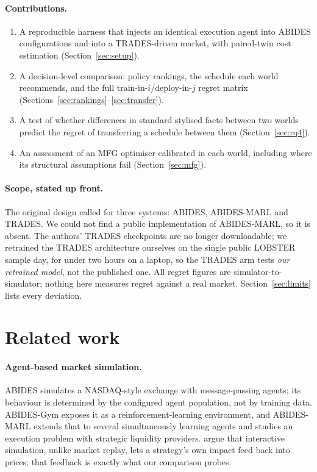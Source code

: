 \paragraph{Contributions.}
\begin{enumerate}[leftmargin=*,itemsep=2pt]
\item A reproducible harness that injects an identical execution agent into ABIDES configurations and into a TRADES-driven market, with paired-twin cost estimation (Section~\ref{sec:setup}).
\item A decision-level comparison: policy rankings, the schedule each world recommends, and the full train-in-$i$/deploy-in-$j$ regret matrix (Sections~\ref{sec:rankings}--\ref{sec:transfer}).
\item A test of whether differences in standard stylised facts between two worlds predict the regret of transferring a schedule between them (Section~\ref{sec:rq4}).
\item An assessment of an MFG optimiser calibrated in each world, including where its structural assumptions fail (Section~\ref{sec:mfg}).
\end{enumerate}

\paragraph{Scope, stated up front.} The original design called for three systems: ABIDES, ABIDES-MARL \citep{cheridito2025abidesmarl} and TRADES. We could not find a public implementation of ABIDES-MARL, so it is absent. The authors' TRADES checkpoints are no longer downloadable; we retrained the TRADES architecture ourselves on the single public LOBSTER sample day, for under two hours on a laptop, so the TRADES arm tests \emph{our retrained model}, not the published one. All regret figures are simulator-to-simulator; nothing here measures regret against a real market. Section~\ref{sec:limits} lists every deviation.

\section{Related work}

\paragraph{Agent-based market simulation.} ABIDES \citep{byrd2019abides} simulates a NASDAQ-style exchange with message-passing agents; its behaviour is determined by the configured agent population, not by training data. ABIDES-Gym \citep{amrouni2021abidesgym} exposes it as a reinforcement-learning environment, and ABIDES-MARL \citep{cheridito2025abidesmarl} extends that to several simultaneously learning agents and studies an execution problem with strategic liquidity providers. \citet{balch2019evaluate} argue that interactive simulation, unlike market replay, lets a strategy's own impact feed back into prices; that feedback is exactly what our comparison probes.

